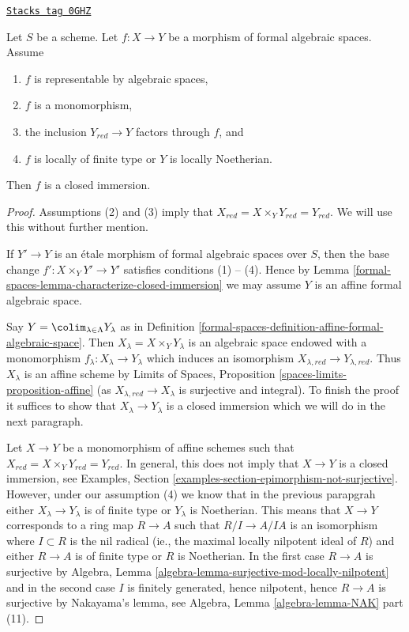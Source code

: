 \begin{lemma}
\label{formal-spaces-lemma-monomorphism-iso-over-red}
\href{https://stacks.math.columbia.edu/tag/0GHZ}{\texttt{Stacks tag 0GHZ}}

Let $S$ be a scheme. Let $f : X \to Y$ be a morphism of formal algebraic
spaces. Assume
\begin{enumerate}
\item $f$ is representable by algebraic spaces,
\item $f$ is a monomorphism,
\item the inclusion $Y_{red} \to Y$ factors through $f$, and
\item $f$ is locally of finite type or $Y$ is locally Noetherian.
\end{enumerate}
Then $f$ is a closed immersion.
\end{lemma}

\begin{proof}
Assumptions (2) and (3) imply that
$X_{red} = X \times_Y Y_{red} = Y_{red}$.
We will use this without further mention.

\medskip\noindent
If $Y' \to Y$ is an \'etale morphism of formal algebraic spaces over $S$,
then the base change $f' : X \times_Y Y' \to Y'$ satisfies conditions
(1) -- (4). Hence by Lemma \ref{formal-spaces-lemma-characterize-closed-immersion}
we may assume $Y$ is an affine formal algebraic space.

\medskip\noindent
Say $Y = \colim_{\lambda \in \Lambda} Y_\lambda$ as in
Definition \ref{formal-spaces-definition-affine-formal-algebraic-space}.
Then $X_\lambda = X \times_Y Y_\lambda$ is an algebraic space
endowed with a monomorphism $f_\lambda : X_\lambda \to Y_\lambda$
which induces an isomorphism $X_{\lambda, red} \to Y_{\lambda, red}$.
Thus $X_\lambda$ is an affine scheme by
Limits of Spaces, Proposition \ref{spaces-limits-proposition-affine}
(as $X_{\lambda, red} \to X_\lambda$ is surjective and integral).
To finish the proof it suffices to show that
$X_\lambda \to Y_\lambda$ is a closed immersion
which we will do in the next paragraph.

\medskip\noindent
Let $X \to Y$ be a monomorphism of affine schemes such that
$X_{red} = X \times_Y Y_{red} = Y_{red}$. In general, this does
not imply that $X \to Y$ is a closed immersion, see
Examples, Section \ref{examples-section-epimorphism-not-surjective}.
However, under our assumption (4) we know that in the previous parapgrah
either $X_\lambda \to Y_\lambda$ is of finite type or $Y_\lambda$
is Noetherian. This means that
$X \to Y$ corresponds to a ring map $R \to A$ such that
$R/I \to A/IA$ is an isomorphism where $I \subset R$ is the
nil radical (ie., the maximal locally nilpotent ideal of $R$)
and either $R \to A$ is of finite type or $R$ is Noetherian.
In the first case $R \to A$ is surjective by
Algebra, Lemma \ref{algebra-lemma-surjective-mod-locally-nilpotent}
and in the second case $I$ is finitely generated, hence
nilpotent, hence $R \to A$ is surjective by Nakayama's lemma, see
Algebra, Lemma \ref{algebra-lemma-NAK} part (11).
\end{proof}

